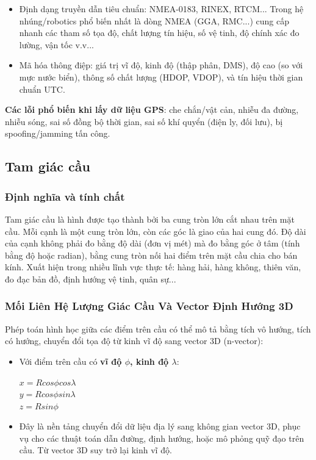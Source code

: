 \begin{itemize}
    \item Định dạng truyền dẫn tiêu chuẩn: NMEA-0183, RINEX, RTCM... Trong hệ nhúng/robotics phổ biến nhất là dòng NMEA (GGA, RMC...) cung cấp nhanh các tham số tọa độ, chất lượng tín hiệu, số vệ tinh, độ chính xác đo lường, vận tốc v.v...
    \item Mã hóa thông điệp: giá trị vĩ độ, kinh độ (thập phân, DMS), độ cao (so với mực nước biển), thông số chất lượng (HDOP, VDOP), và tín hiệu thời gian chuẩn UTC.
\end{itemize}
\textbf{Các lỗi phổ biến khi lấy dữ liệu GPS}: che chắn/vật cản, nhiễu đa đường, nhiễu sóng, sai số đồng bộ thời gian, sai số khí quyển (điện ly, đối lưu), bị spoofing/jamming tấn công.

\subsection{Tam giác cầu}
\subsubsection{Định nghĩa và tính chất}
Tam giác cầu là hình được tạo thành bởi ba cung tròn lớn cắt nhau trên mặt cầu. Mỗi cạnh là một cung tròn lớn, còn các góc là giao của hai cung đó. Độ dài của cạnh không phải đo bằng độ dài (đơn vị mét) mà đo bằng góc ở tâm (tính bằng độ hoặc radian), bằng cung tròn nối hai điểm trên mặt cầu chia cho bán kính. Xuất hiện trong nhiều lĩnh vực thực tế: hàng hải, hàng không, thiên văn, đo đạc bản đồ, định hướng vệ tinh, quân sự...
\subsubsection{Mối Liên Hệ Lượng Giác Cầu Và Vector Định Hướng 3D}
Phép toán hình học giữa các điểm trên cầu có thể mô tả bằng tích vô hướng, tích có hướng, chuyển đổi tọa độ từ kinh vĩ độ sang vector 3D (n-vector):
\begin{itemize}
    \item Với điểm trên cầu có \textbf{vĩ độ $\phi$, kinh độ $\lambda$}:
    \begin{center}
        $x = Rcos\phi cos\lambda$ \\
        $y = Rcos\phi sin\lambda$ \\
        $z = Rsin\phi$ \\
    \end{center}
\item Đây là nền tảng chuyển đổi dữ liệu địa lý sang không gian vector 3D, phục vụ cho các thuật toán dẫn đường, định hướng, hoặc mô phỏng quỹ đạo trên cầu. Từ vector 3D suy trở lại kinh vĩ độ.

\end{itemize}

